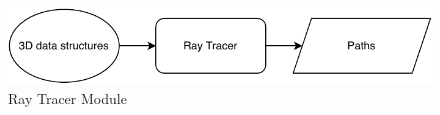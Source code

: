 \begin{figure}[H]
    \begin{center}
    \includegraphics[width=\textwidth]{figures/approach/figRayTracer.pdf}
    \end{center}
    \caption[Ray Tracer Module]{Ray Tracer Module}
    \label{fig:rayTracer}
\end{figure}
